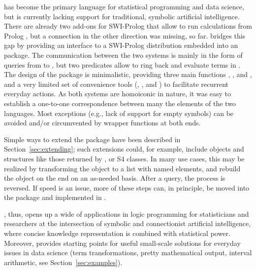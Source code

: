 \documentclass[article]{jss}
\begin{document}
 has become the primary language for statistical programming and
data science, but is currently lacking support for traditional, symbolic
artificial intelligence. There are already two add-ons for SWI-Prolog that allow
to run  calculations from Prolog \citep{Angelopoulos2013,Rserve},
but a connection in the other direction was missing, so far.  bridges
this gap by providing an interface to a SWI-Prolog distribution embedded into
an  package. The communication between the two systems is mainly in
the form of queries from  to , but two predicates
allow  to ring back and evaluate terms in . The
design of the package is minimalistic, providing three main 
functions , , and , and a very
limited set of convenience tools (, , 
and ) to facilitate recurrent everyday actions. As both
systems are homoiconic in nature, it was easy to establish a one-to-one
correspondence between many the elements of the two languages. Most
exceptions (e.g., lack of  support for empty symbols) can be
avoided and/or circumvented by wrapper functions at both ends.

Simple ways to extend the package have been described in 
Section~\ref{sec:extending}; such extensions could, for example, 
include  objects and structures like those returned by ,
or S4 classes. In many use cases, this may be realized by transforming
the  object to a list with named elements, and rebuild the
object on the  end on an as-needed basis. After a query, the
process is reversed. If speed is an issue, more of these steps can, in
principle, be moved into the package and implemented in .

, thus, opens up a wide of applications in logic programming for
statisticians and researchers at the intersection of symbolic and connectionist
artificial intelligence, where concise knowledge representation is combined with
statistical power. Moreover,  provides starting points for useful
small-scale solutions for everyday issues in data science (term transformations,
pretty mathematical output, interval arithmetic, see 
Section~\ref{sec:examples}).
\end{document}
